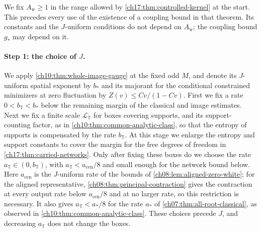 We fix $A_{\mathrm w}\ge1$ in the range allowed by \cref{ch17:thm:controlled-kernel} at the start. This precedes every use of the existence of a coupling bound in that theorem. Its constants and the $J$-uniform conditions do not depend on $A_{\mathrm w}$; the coupling bound $g_*$ may depend on it.

\paragraph{Step 1: the choice of $J$.}
We apply \cref{ch10:thm:whole-image-gauge} at the fixed odd $M$, and denote its $J$-uniform spatial exponent by $b_*$ and its majorant for the conditional constrained minimizers at zero fluctuation by $Z(v)\le Cv/(1-Cv)$. First we fix a rate $0<b_{\mathbb T}<b_*$ below the remaining margin of the classical and image estimates. Next we fix a finite scale $\mathscr L_{\mathbb T}$ for boxes covering supports, and its support-counting factor, as in \cref{ch10:thm:common-analytic-class}, so that the entropy of supports is compensated by the rate $b_{\mathbb T}$. At this stage we enlarge the entropy and support constants to cover the margin for the free degrees of freedom in \cref{ch17:thm:carried-networks}. Only after fixing these boxes do we choose the rate $a_{\mathbb T}\in(0,b_{\mathbb T})$, with $a_{\mathbb T}<a_{\mathrm{cen}}/8$ and small enough for the network bound below. Here $a_{\mathrm{cen}}$ is the $J$-uniform rate of the bounds of \cref{ch08:lem:aligned-zero-white}; for the aligned representative, \cref{ch08:thm:principal-contraction} gives the contraction at every output rate below $a_{\mathrm{cen}}/8$ and at no larger rate, so this restriction is necessary. It also gives $a_{\mathbb T}<a_*/8$ for the rate $a_*$ of \cref{ch07:thm:all-root-classical}, as observed in \cref{ch10:thm:common-analytic-class}. These choices precede $J$, and decreasing $a_{\mathbb T}$ does not change the boxes.


